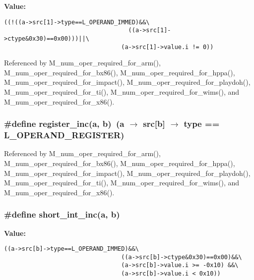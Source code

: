 \textbf{Value:}

\begin{Code}\begin{verbatim}((!((a->src[1]->type==L_OPERAND_IMMED)&&\
                                   ((a->src[1]->ctype&0x30)==0x00)))||\
                                 (a->src[1]->value.i != 0))
\end{verbatim}\end{Code}


Referenced by M\_\-num\_\-oper\_\-required\_\-for\_\-arm(), M\_\-num\_\-oper\_\-required\_\-for\_\-bx86(), M\_\-num\_\-oper\_\-required\_\-for\_\-hppa(), M\_\-num\_\-oper\_\-required\_\-for\_\-impact(), M\_\-num\_\-oper\_\-required\_\-for\_\-playdoh(), M\_\-num\_\-oper\_\-required\_\-for\_\-ti(), M\_\-num\_\-oper\_\-required\_\-for\_\-wims(), and M\_\-num\_\-oper\_\-required\_\-for\_\-x86().
\subsubsection{\setlength{\rightskip}{0pt plus 5cm}\#define register\_\-inc(a, b)~(a $\rightarrow$ src[b] $\rightarrow$ type == L\_\-OPERAND\_\-REGISTER)}\label{ml__arm_8c_1e7b7d7ff33cab42b74ae66e888b1124}




Referenced by M\_\-num\_\-oper\_\-required\_\-for\_\-arm(), M\_\-num\_\-oper\_\-required\_\-for\_\-bx86(), M\_\-num\_\-oper\_\-required\_\-for\_\-hppa(), M\_\-num\_\-oper\_\-required\_\-for\_\-impact(), M\_\-num\_\-oper\_\-required\_\-for\_\-playdoh(), M\_\-num\_\-oper\_\-required\_\-for\_\-ti(), M\_\-num\_\-oper\_\-required\_\-for\_\-wims(), and M\_\-num\_\-oper\_\-required\_\-for\_\-x86().
\subsubsection{\setlength{\rightskip}{0pt plus 5cm}\#define short\_\-int\_\-inc(a, b)}\label{ml__arm_8c_beca719e984ec0dc73106055269cd986}


\textbf{Value:}

\begin{Code}\begin{verbatim}((a->src[b]->type==L_OPERAND_IMMED)&&\
                                 ((a->src[b]->ctype&0x30)==0x00)&&\
                                 (a->src[b]->value.i >= -0x10) &&\
                                 (a->src[b]->value.i < 0x10))
\end{verbatim}\end{Code}


